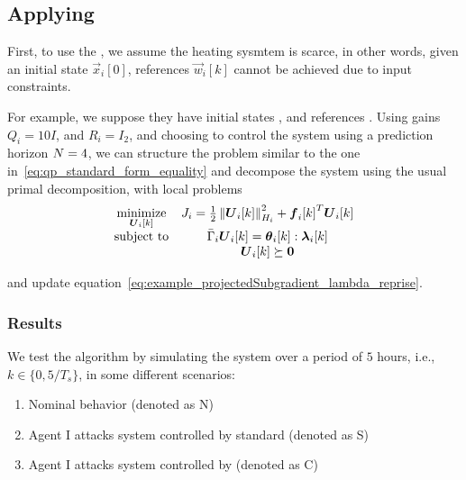 \documentclass[../main.tex]{subfiles}
\begin{document}
\subsection{Applying \rpdmpcss{}}
First, to use the \rpdmpcss{}, we assume the heating sysmtem is scarce, in other words, given an initial state $\vec{x}_{i}[0]$, references $\vec{w}_{i}[k]$ cannot be achieved due to input constraints.

For example, we suppose they have initial states
, and references
.
Using gains
$Q_{i}=10I$,
and
$R_{i}=   I_{2}$,
and choosing to control the system using a prediction horizon
$N=4$,
we can structure the \dmpc{} problem similar to the one in~\eqref{eq:qp_standard_form_equality} and decompose the system using the usual primal decomposition, with local problems
\begin{equation}
  \label{eq:houses_scarce_local_problem}
  \begin{matrix}
    \minimize\limits_{\vec{U}_{i}[k]}&\obji=\frac{1}{2}\norm{\vec{U}_{i}[k]}^{2}_{H_{i}} + {\vec{f}_{i}[k]}^{T}\vec{U}_{i}[k]\\
    \mathrm{subject~ to} & \bar{\Gamma}_{i}\vec{U}_{i}[k] = \thetaik:\lambdaik\\
                                     &\vec{U}_{i}[k]\succeq\0
  \end{matrix}
\end{equation}

and update equation~\eqref{eq:example_projectedSubgradient_lambda_reprise}.

\subsubsection{Results}\label{sec:results}
We test the algorithm by simulating the system over a period of
$5$
hours, i.e.,
${k\in\{0,5/T_{s}\}}$,
in some different scenarios:
\begin{enumerate}
  \item Nominal behavior (denoted as N)
  \item Agent I attacks system controlled by standard \dmpc{} (denoted as S)\label{it:case_selfish}
  \item Agent I attacks system controlled by \rpdmpcss{} (denoted as C)\label{it:case_selfish_recovered}
\end{enumerate}
\end{document}
